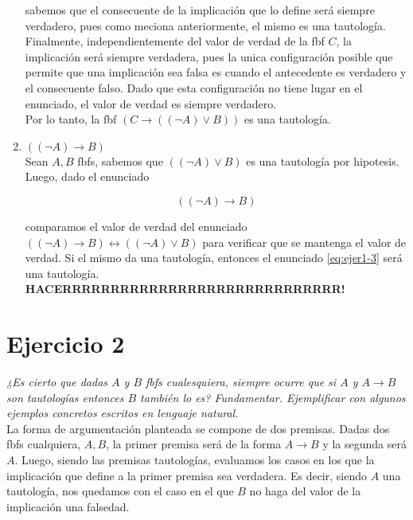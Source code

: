 \documentclass[osajnl,twocolumn,showpacs,superscriptaddress,10pt]{revtex4-1} %
\begin{document}
\begin{enumerate}
  sabemos que el consecuente de la implicación que lo define será siempre verdadero, pues como meciona anteriormente, el mismo es una tautología. Finalmente, independientemente del valor de verdad de la fbf $C$, la implicación será siempre verdadera, pues la unica configuración posible que permite que una implicación sea falsa es cuando el antecedente es verdadero y el consecuente falso. Dado que esta configuración no tiene lugar en el enunciado, el valor de verdad es siempre verdadero. \\

  Por lo tanto, la fbf $(C \rightarrow ((\neg A) \vee B))$ es una tautología. \\

  \item $((\neg A) \rightarrow B)$ \\

  Sean $A, B$ fbfs, sabemos que $((\neg A) \vee B)$ es una tautología por hipotesis. Luego, dado el enunciado

  \begin{equation}
    ((\neg A) \rightarrow B)
    \label{eq:ejer1-3}
  \end{equation}

  comparamos el valor de verdad del enunciado $((\neg A) \rightarrow B) \leftrightarrow ((\neg A) \vee B)$ para verificar que se mantenga el valor de verdad. Si el mismo da una tautología, entonces el enunciado \ref{eq:ejer1-3} será una tautología. \\

  \textbf{HACERRRRRRRRRRRRRRRRRRRRRRRRRRRRR!} \\
\end{enumerate}

\section{Ejercicio 2}

\textit{¿Es cierto que dadas $A$ y $B$ fbfs cualesquiera, siempre ocurre que si $A$ y $A \rightarrow B$ son tautologías entonces $B$ también lo es? Fundamentar. Ejemplificar con algunos ejemplos concretos escritos en lenguaje natural.} \\

La forma de argumentación planteada se compone de dos premisas. Dadas dos fbfs cualquiera, $A, B$, la primer premisa será de la forma $A \rightarrow B$ y la segunda será $A$. Luego, siendo las premisas tautologías,
evaluamos los casos en los que la implicación que define a la primer premisa sea verdadera. Es decir, siendo $A$ una tautología, nos quedamos con el caso en el que $B$ no haga del valor de la implicación una falsedad. \\
\end{document}
